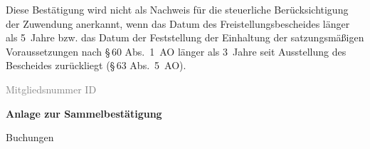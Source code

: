 \documentclass[11pt,ngerman]{scrartcl}
\newcommand{\VAR}[1]{#1}
\begin{document}
Diese Bestätigung wird nicht als Nachweis für die steuerliche Berücksichtigung der Zuwendung anerkannt, wenn das Datum des Freistellungsbescheides länger als 5~Jahre bzw. das Datum der Feststellung der Einhaltung der satzungsmäßigen Voraussetzungen nach §\,60 Abs.~1~AO länger als 3~Jahre seit Ausstellung des Bescheides zurückliegt (§\,63 Abs.~5~AO). 

\vfill \footnotesize{\textcolor{gray}{Mitgliedsnummer \VAR{ID}}}

\clearpage

{\bfseries\large Anlage zur Sammelbestätigung} \vspace*{2em}


\VAR{Buchungen}
\end{document}
